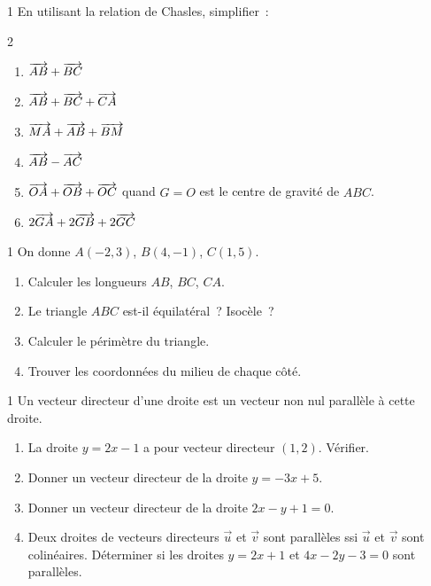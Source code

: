 \begin{exo}{1}
En utilisant la relation de Chasles, simplifier~:
\begin{multicols}{2}
\begin{enumerate}
  \item $\overrightarrow{AB}+\overrightarrow{BC}$
  \item $\overrightarrow{AB}+\overrightarrow{BC}+\overrightarrow{CA}$
  \item $\overrightarrow{MA}+\overrightarrow{AB}+\overrightarrow{BM}$
  \item $\overrightarrow{AB}-\overrightarrow{AC}$
  \item $\overrightarrow{OA}+\overrightarrow{OB}+\overrightarrow{OC}$ quand $G=O$ est le centre de gravité de $ABC$.
  \item $2\overrightarrow{GA}+2\overrightarrow{GB}+2\overrightarrow{GC}$
\end{enumerate}
\end{multicols}
\end{exo}

\begin{exo}{1}
On donne $A(-2,3)$, $B(4,-1)$, $C(1,5)$.
\begin{enumerate}
  \item Calculer les longueurs $AB$, $BC$, $CA$.
  \item Le triangle $ABC$ est-il \'equilat\'eral~? Isoc\`ele~?
  \item Calculer le p\'erim\`etre du triangle.
  \item Trouver les coordonn\'ees du milieu de chaque c\^ot\'e.
\end{enumerate}
\end{exo}

\begin{exo}{1}
Un vecteur directeur d'une droite est un vecteur non nul parall\`ele
\`a cette droite.
\begin{enumerate}
  \item La droite $y = 2x - 1$ a pour vecteur directeur $(1, 2)$.
        V\'erifier.
  \item Donner un vecteur directeur de la droite $y = -3x + 5$.
  \item Donner un vecteur directeur de la droite $2x - y + 1 = 0$.
  \item Deux droites de vecteurs directeurs $\vec{u}$ et $\vec{v}$
        sont parall\`eles ssi $\vec{u}$ et $\vec{v}$ sont colin\'eaires.
        D\'eterminer si les droites $y=2x+1$ et $4x-2y-3=0$ sont parall\`eles.
\end{enumerate}
\end{exo}

